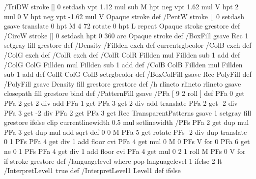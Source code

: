 /TriDW {stroke [] 0 setdash vpt 1.12 mul sub M
  hpt neg vpt 1.62 mul V
  hpt 2 mul 0 V
  hpt neg vpt -1.62 mul V Opaque stroke} def
/PentW {stroke [] 0 setdash gsave
  translate 0 hpt M 4 {72 rotate 0 hpt L} repeat
  Opaque stroke grestore} def
/CircW {stroke [] 0 setdash 
  hpt 0 360 arc Opaque stroke} def
/BoxFill {gsave Rec 1 setgray fill grestore} def
/Density {
  /Fillden exch def
  currentrgbcolor
  /ColB exch def /ColG exch def /ColR exch def
  /ColR ColR Fillden mul Fillden sub 1 add def
  /ColG ColG Fillden mul Fillden sub 1 add def
  /ColB ColB Fillden mul Fillden sub 1 add def
  ColR ColG ColB setrgbcolor} def
/BoxColFill {gsave Rec PolyFill} def
/PolyFill {gsave Density fill grestore grestore} def
/h {rlineto rlineto rlineto gsave closepath fill grestore} bind def
%
%
/PatternFill {gsave /PFa [ 9 2 roll ] def
  PFa 0 get PFa 2 get 2 div add PFa 1 get PFa 3 get 2 div add translate
  PFa 2 get -2 div PFa 3 get -2 div PFa 2 get PFa 3 get Rec
  TransparentPatterns {} {gsave 1 setgray fill grestore} ifelse
  clip
  currentlinewidth 0.5 mul setlinewidth
  /PFs PFa 2 get dup mul PFa 3 get dup mul add sqrt def
  0 0 M PFa 5 get rotate PFs -2 div dup translate
  0 1 PFs PFa 4 get div 1 add floor cvi
	{PFa 4 get mul 0 M 0 PFs V} for
  0 PFa 6 get ne {
	0 1 PFs PFa 4 get div 1 add floor cvi
	{PFa 4 get mul 0 2 1 roll M PFs 0 V} for
 } if
  stroke grestore} def
%
/languagelevel where
 {pop languagelevel} {1} ifelse
 2 lt
	{/InterpretLevel1 true def}
	{/InterpretLevel1 Level1 def}
 ifelse
%
%
